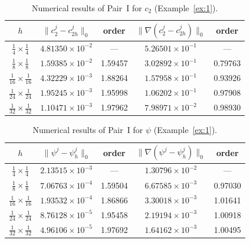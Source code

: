 \begin{table}[htbp]
\centering
\caption{Numerical results of Pair~I for $c_{2}$ (Example~\ref{ex:1}).}
\label{tab:PairI-c2}
\begin{tabular}{ccccc}
\hline
$h$ &
$\|c_{2}^{j} - c_{2h}^{j}\|_{0}$ & order &
$\|\nabla(c_{2}^{j} - c_{2h}^{j})\|_{0}$ & order \\
\hline
$\tfrac{1}{4} \times \tfrac{1}{4}$   & $4.81350\times10^{-2}$ & ---     & $5.26501\times10^{-1}$ & ---     \\
$\tfrac{1}{8} \times \tfrac{1}{8}$   & $1.59385\times10^{-2}$ & 1.59457 & $3.02892\times10^{-1}$ & 0.79763 \\
$\tfrac{1}{16}\times \tfrac{1}{16}$  & $4.32229\times10^{-3}$ & 1.88264 & $1.57958\times10^{-1}$ & 0.93926 \\
$\tfrac{1}{24}\times \tfrac{1}{24}$  & $1.95245\times10^{-3}$ & 1.95998 & $1.06202\times10^{-1}$ & 0.97908 \\
$\tfrac{1}{32}\times \tfrac{1}{32}$  & $1.10471\times10^{-3}$ & 1.97962 & $7.98971\times10^{-2}$ & 0.98930 \\
\hline
\end{tabular}
\end{table}

\begin{table}[htbp]
\centering
\caption{Numerical results of Pair~I for $\psi$ (Example~\ref{ex:1}).}
\label{tab:PairI-psi}
\begin{tabular}{ccccc}
\hline
$h$ &
$\|\psi^{j} - \psi_{h}^{j}\|_{0}$ & order &
$\|\nabla(\psi^{j} - \psi_{h}^{j})\|_{0}$ & order \\
\hline
$\tfrac{1}{4} \times \tfrac{1}{4}$   & $2.13515\times10^{-3}$ & ---     & $1.30796\times10^{-2}$ & ---     \\
$\tfrac{1}{8} \times \tfrac{1}{8}$   & $7.06763\times10^{-4}$ & 1.59504 & $6.67585\times10^{-3}$ & 0.97030 \\
$\tfrac{1}{16}\times \tfrac{1}{16}$  & $1.93532\times10^{-4}$ & 1.86866 & $3.30018\times10^{-3}$ & 1.01641 \\
$\tfrac{1}{24}\times \tfrac{1}{24}$  & $8.76128\times10^{-5}$ & 1.95458 & $2.19194\times10^{-3}$ & 1.00918 \\
$\tfrac{1}{32}\times \tfrac{1}{32}$  & $4.96106\times10^{-5}$ & 1.97692 & $1.64162\times10^{-3}$ & 1.00495 \\
\hline
\end{tabular}
\end{table}

